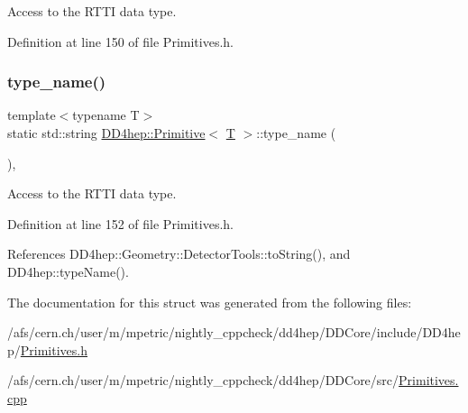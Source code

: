 Access to the R\+T\+TI data type. 



Definition at line 150 of file Primitives.\+h.

\hypertarget{struct_d_d4hep_1_1_primitive_adc0e54033e0242d525537cfa2900f3b8}{}\label{struct_d_d4hep_1_1_primitive_adc0e54033e0242d525537cfa2900f3b8} 
\subsubsection{\texorpdfstring{type\+\_\+name()}{type\_name()}}
{\footnotesize\ttfamily template$<$typename T$>$ \\
static std\+::string \hyperlink{struct_d_d4hep_1_1_primitive}{D\+D4hep\+::\+Primitive}$<$ \hyperlink{class_t}{T} $>$\+::type\+\_\+name (\begin{DoxyParamCaption}{ }\end{DoxyParamCaption})\hspace{0.3cm}{\ttfamily [inline]}, {\ttfamily [static]}}



Access to the R\+T\+TI data type. 



Definition at line 152 of file Primitives.\+h.



References D\+D4hep\+::\+Geometry\+::\+Detector\+Tools\+::to\+String(), and D\+D4hep\+::type\+Name().



The documentation for this struct was generated from the following files\+:\begin{DoxyCompactItemize}
\item 
/afs/cern.\+ch/user/m/mpetric/nightly\+\_\+cppcheck/dd4hep/\+D\+D\+Core/include/\+D\+D4hep/\hyperlink{_primitives_8h}{Primitives.\+h}\item 
/afs/cern.\+ch/user/m/mpetric/nightly\+\_\+cppcheck/dd4hep/\+D\+D\+Core/src/\hyperlink{_primitives_8cpp}{Primitives.\+cpp}\end{DoxyCompactItemize}
